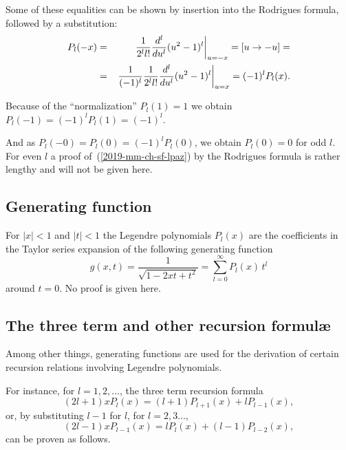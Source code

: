 {\color{OliveGreen}
\bproof


Some of these equalities can be shown by  insertion into  the  Rodrigues formula, followed by a substitution:
\begin{eqnarray*}
   P_l(-x)&=&\left.{1\over 2^ll!}{d^l\over du^l}(u^2-1)^l\right|_{u=-x}
   =[u\to-u]=\\
   &=&\left.{1\over(-1)^l}{1\over2^ll!}{d^l\over du^l}(u^2-1)^l
   \right|_{u=x}=(-1)^lP_l(x).
\end{eqnarray*}

Because of the ``normalization'' $P_l(1)=1$ we obtain $P_l(-1)=(-1)^lP_l(1)=(-1)^l$.

And as $P_l(-0)=P_l(0)=(-1)^lP_l(0)$, we obtain $P_l(0)=0$ for odd $l$.
For even $l$ a proof of~(\ref{2019-mm-ch-sf-lpaz}) by the  Rodrigues formula
is rather lengthy and will not be given here.


\eproof
}



\subsection{Generating function}

For
$\vert x\vert<1$ and
$\vert t\vert<1$ the
Legendre polynomials $P_l(x)$ are the coefficients in the Taylor series expansion of the following generating function
\begin{equation}
g(x,t) =\frac{1}{\sqrt{1-2xt+t^2}}=\sum_{l=0}^\infty P_l(x)\, t^l
\end{equation}
 around $t=0$.
No proof is given here.

\subsection{The three term and other recursion formul\ae}

Among other things, generating functions are used for the derivation of certain recursion relations involving Legendre polynomials.

For instance, for $l=1,2,\ldots$, the   three term recursion formula
\begin{equation}
(2l+1)x P_l(x) = (l+1) P_{l+1}(x)+lP_{l-1}(x) ,
\label{2020-lp1}
\end{equation}
or, by substituting $l-1$ for $l$,  for $l=2,3\ldots$,
\begin{equation}
(2l-1)x P_{l-1}(x) = l P_{l}(x)+(l-1)P_{l-2}(x),
\end{equation}
can be proven as follows.

